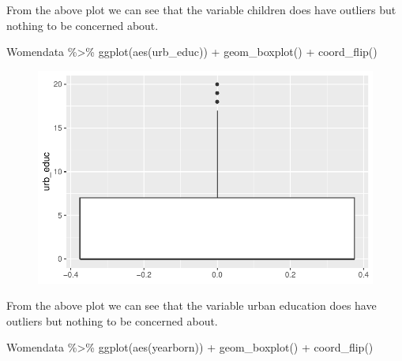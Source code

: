 \documentclass[
  letterpaper,
  DIV=11,
  numbers=noendperiod]{scrartcl}
\newenvironment{Shaded}{\begin{snugshade}}{\end{snugshade}}
\newcommand{\FunctionTok}[1]{\textcolor[rgb]{0.28,0.35,0.67}{#1}}
\newcommand{\NormalTok}[1]{\textcolor[rgb]{0.00,0.23,0.31}{#1}}
\newcommand{\SpecialCharTok}[1]{\textcolor[rgb]{0.37,0.37,0.37}{#1}}
\begin{document}
From the above plot we can see that the variable children does have
outliers but nothing to be concerned about.

\begin{Shaded}
\begin{Highlighting}[]
\NormalTok{Womendata }\SpecialCharTok{\%\textgreater{}\%}
  \FunctionTok{ggplot}\NormalTok{(}\FunctionTok{aes}\NormalTok{(urb\_educ)) }\SpecialCharTok{+}
  \FunctionTok{geom\_boxplot}\NormalTok{() }\SpecialCharTok{+}
  \FunctionTok{coord\_flip}\NormalTok{()}
\end{Highlighting}
\end{Shaded}

\begin{figure}[H]

{\centering \includegraphics{Fertility_Rates_Education_Impact_Botswana_files/figure-pdf/unnamed-chunk-16-1.pdf}

}

\end{figure}

From the above plot we can see that the variable urban education does
have outliers but nothing to be concerned about.

\begin{Shaded}
\begin{Highlighting}[]
\NormalTok{Womendata }\SpecialCharTok{\%\textgreater{}\%}
  \FunctionTok{ggplot}\NormalTok{(}\FunctionTok{aes}\NormalTok{(yearborn)) }\SpecialCharTok{+}
  \FunctionTok{geom\_boxplot}\NormalTok{() }\SpecialCharTok{+}
  \FunctionTok{coord\_flip}\NormalTok{()}
\end{Highlighting}
\end{Shaded}
\end{document}
